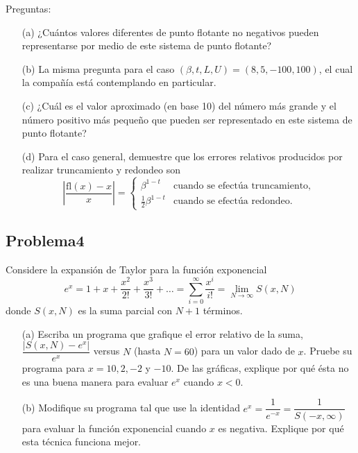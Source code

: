 \documentclass[12pt, a4paper]{article}%
\begin{document}
Preguntas:
\begin{itemize}
    \item[(a)] ¿Cuántos valores diferentes de punto flotante no negativos pueden representarse por medio de este sistema de punto flotante?
    \item[(b)] La misma pregunta para el caso \( (\beta, t, L, U) = (8, 5, -100, 100) \), el cual la compañía está contemplando en particular.
    \item[(c)] ¿Cuál es el valor aproximado (en base 10) del número más grande y el número positivo más pequeño que pueden ser representado en este sistema de punto flotante?
    \item[(d)] Para el caso general, demuestre que los errores relativos producidos por realizar truncamiento y redondeo son
    \[
    \left|\frac{\text{fl}(x) - x}{x}\right| = 
    \begin{cases}
        \beta^{1-t} & \text{cuando se efectúa truncamiento}, \\
        \frac{1}{2} \beta^{1-t} & \text{cuando se efectúa redondeo}.
    \end{cases}
    \]
\end{itemize}

\subsection*{Problema4}
Considere la expansión de Taylor para la función exponencial
\[
e^x = 1 + x + \frac{x^2}{2!} + \frac{x^3}{3!} + \dots = \sum_{i=0}^{\infty} \frac{x^i}{i!} = \lim_{N \to \infty} S(x, N)
\]
donde \( S(x, N) \) es la suma parcial con \( N + 1 \) términos.

\begin{itemize}
    \item[(a)] Escriba un programa que grafique el error relativo de la suma, \( \dfrac{|S(x, N) - e^x|}{e^x} \) versus \( N \) (hasta \( N = 60 \)) para un valor dado de \( x \). Pruebe su programa para \( x = 10, 2, -2 \) y \( -10 \). De las gráficas, explique por qué ésta no es una buena manera para evaluar \( e^x \) cuando \( x < 0 \).
    \item[(b)] Modifique su programa tal que use la identidad \( e^x = \dfrac{1}{e^{-x}} = \dfrac{1}{S(-x, \infty)} \) para evaluar la función exponencial cuando \( x \) es negativa. Explique por qué esta técnica funciona mejor.
\end{itemize}
\end{document}
